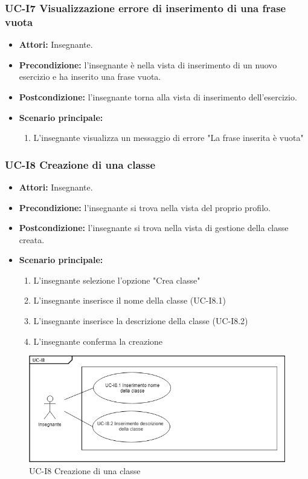 \subsubsection{UC-I7 Visualizzazione errore di inserimento di una frase vuota}
\begin{itemize}
	\item \textbf{Attori:} Insegnante.
	\item \textbf{Precondizione:} l'insegnante è nella vista di inserimento di un nuovo esercizio e ha inserito una frase vuota.
	\item \textbf{Postcondizione:} l'insegnante torna alla vista di inserimento dell'esercizio.
	\item \textbf{Scenario principale:}
	\begin{enumerate}
		\item L'insegnante visualizza un messaggio di errore "La frase inserita è vuota"
	\end{enumerate}
\end{itemize}

\subsubsection{UC-I8 Creazione di una classe}
\begin{itemize}
	\item \textbf{Attori:} Insegnante.
	\item \textbf{Precondizione:} l'insegnante si trova nella vista del proprio profilo.
	\item \textbf{Postcondizione:} l'insegnante si trova nella vista di gestione della classe creata.
	\item \textbf{Scenario principale:}
	\begin{enumerate}
		\item L'insegnante selezione l'opzione "Crea classe"
		\item L'insegnante inserisce il nome della classe (UC-I8.1)
		\item L'insegnante inserisce la descrizione della classe (UC-I8.2)
		\item L'insegnante conferma la creazione
	\end{enumerate}
\end{itemize}

\begin{figure}[h]
		\centering
		\includegraphics[scale=0.7]{images/UC-I8.png}
		\caption{UC-I8 Creazione di una classe}
	\end{figure}

